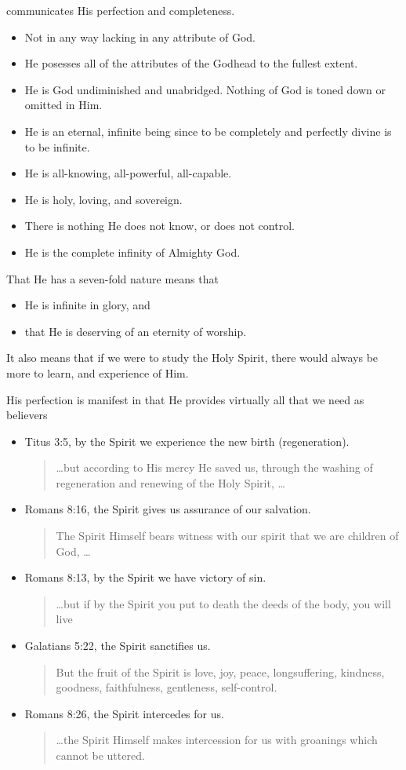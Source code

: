 \documentclass[12pt]{article}
\newcommand{\BI}{\begin{itemize}}
\newcommand{\EI}{\end{itemize}}
\newcommand{\I}{\item}
\newcommand{\Q}[1]{\begin{quote} #1 \end{quote}}
\begin{document}
    communicates His perfection and completeness.
\BI \I  Not in any way lacking in any attribute of God.
    \I  He posesses all of the attributes of the Godhead to the fullest extent.
    \I  He is God undiminished and unabridged. 
        Nothing of God is toned down or omitted in Him.
    \I  He is an eternal, infinite being since 
        to be completely and perfectly divine is to be infinite.
    \I  He is all-knowing, all-powerful, all-capable.
    \I  He is holy, loving, and sovereign.
    \I  There is nothing He does not know, or does not control.
    \I  He is the complete infinity of Almighty God. \EI
\I  That He has a seven-fold nature means that
\BI \I  He is infinite in glory, and
    \I  that He is deserving of an eternity of worship. \EI
\I  It also means that if we were to study the Holy Spirit, 
    there would always be more to learn, and experience of Him.
\I  His perfection is manifest in that He provides virtually all that
    we need as believers
\BI \I  Titus 3:5, by the Spirit we experience the new birth (regeneration).
        \Q{ \ldots but according to His mercy He saved us,
            through the washing of regeneration and renewing of the Holy Spirit,
            \ldots}
    \I  Romans 8:16, the Spirit gives us assurance of our salvation.
        \Q{The Spirit Himself bears witness with our spirit that we are children
            of God, \ldots}
    \I  Romans 8:13, by the Spirit we have victory of sin.
        \Q{ \ldots but if by the Spirit you put to death the deeds of the body,
            you will live}
    \I  Galatians 5:22, the Spirit sanctifies us.
        \Q{ But the fruit of the Spirit is love, joy, peace, longsuffering,
            kindness, goodness, faithfulness, gentleness, self-control.}
    \I  Romans 8:26, the Spirit intercedes for us.
        \Q{ \ldots the Spirit Himself makes intercession for us with 
            groanings which cannot be uttered.} \EI
\end{document}
